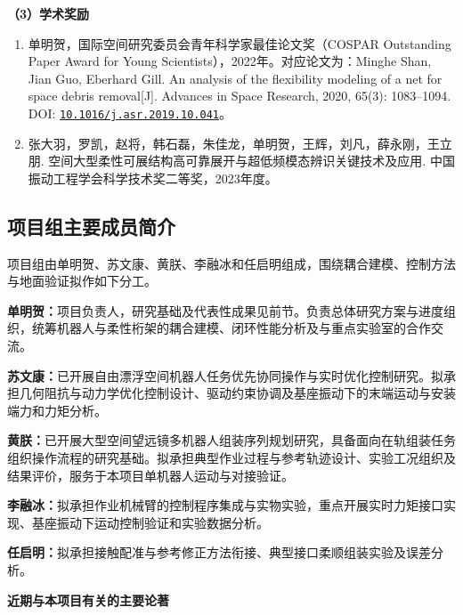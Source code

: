 \documentclass[UTF8,a4paper,zihao=-4,fontset=fandol]{ctexart}
\newcommand{\topic}[1]{\par\Needspace{4\baselineskip}\addvspace{0.5em}\noindent\textbf{#1}\par\nobreak}
\newcommand{\rev}[1]{{\color{red}#1}}
\newcommand{\doi}[1]{\href{https://doi.org/#1}{\nolinkurl{#1}}}
\begin{document}
\topic{（3）学术奖励}

\begin{enumerate}[label=\arabic*.]
\item 单明贺，国际空间研究委员会青年科学家最佳论文奖（COSPAR Outstanding Paper Award for Young Scientists），2022年。对应论文为：Minghe Shan, Jian Guo, Eberhard Gill. An analysis of the flexibility modeling of a net for space debris removal[J]. Advances in Space Research, 2020, 65(3): 1083--1094. DOI: \doi{10.1016/j.asr.2019.10.041}。
\item 张大羽，罗凯，赵将，韩石磊，朱佳龙，单明贺，王辉，刘凡，薛永刚，王立朋. 空间大型柔性可展结构高可靠展开与超低频模态辨识关键技术及应用. 中国振动工程学会科学技术奖二等奖，2023年度。
\end{enumerate}

\subsection{项目组主要成员简介}

项目组由单明贺、苏文康、黄朕、李融冰和任启明组成，围绕耦合建模、控制方法与地面验证拟作如下分工。

\textbf{单明贺：}项目负责人，研究基础及代表性成果见前节。负责总体研究方案与进度组织，统筹机器人与柔性桁架的耦合建模、闭环性能分析及与重点实验室的合作交流。

\textbf{苏文康：}已开展自由漂浮空间机器人任务优先协同操作与实时优化控制研究。拟承担几何阻抗与动力学优化控制设计、驱动约束协调及基座振动下的末端运动与安装端力和力矩分析。

\textbf{黄朕：}已开展大型空间望远镜多机器人组装序列规划研究，具备面向在轨组装任务组织操作流程的研究基础。拟承担典型作业过程与参考轨迹设计、实验工况组织及结果评价，服务于本项目单机器人运动与对接验证。

\textbf{李融冰：}拟承担作业机械臂的控制程序集成与实物实验，重点开展实时力矩接口实现、基座振动下运动控制验证和实验数据分析。

\textbf{\rev{任启明：}}\rev{拟承担接触配准与参考修正方法衔接、典型接口柔顺组装实验及误差分析。}

\topic{近期与本项目有关的主要论著}
\end{document}
